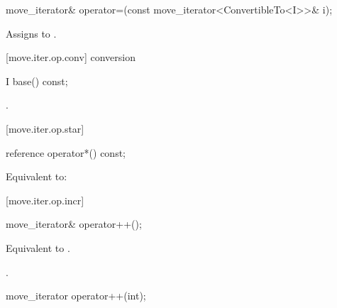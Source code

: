 %
%
\begin{itemdecl}
move_iterator& operator=(const move_iterator<ConvertibleTo<I>>& i);
\end{itemdecl}

\begin{itemdescr}
\pnum
\effects Assigns  to
.
\end{itemdescr}

[move.iter.op.conv]{ conversion}

%
%
\begin{itemdecl}
I base() const;
\end{itemdecl}

\begin{itemdescr}
\pnum
\returns {}.
\end{itemdescr}

[move.iter.op.star]{}

%
%
\begin{itemdecl}
reference operator*() const;
\end{itemdecl}

\begin{itemdescr}
\pnum
\effects Equivalent to:
\end{itemdescr}

[move.iter.op.incr]{}

%
%
\begin{itemdecl}
move_iterator& operator++();
\end{itemdecl}

\begin{itemdescr}
\pnum
\effects Equivalent to .

\pnum
\returns {}.
\end{itemdescr}

%
%
\begin{itemdecl}
move_iterator operator++(int);
\end{itemdecl}

